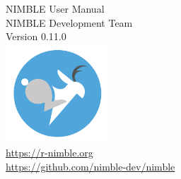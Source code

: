 \thispagestyle{empty}
\begin{center}
{\huge NIMBLE User Manual}\\ 
\vspace{0.2in}
{\large NIMBLE Development Team}\\
\vspace{0.2in}
{\large Version 0.11.0}\\
\vspace{3in}
\includegraphics[width=1.5in]{../nimble-icon.png}\\
{\large
\href{https://r-nimble.org}{https://r-nimble.org}\\
\href{https://github.com/nimble-dev/nimble}{https://github.com/nimble-dev/nimble}
}
\end{center}

